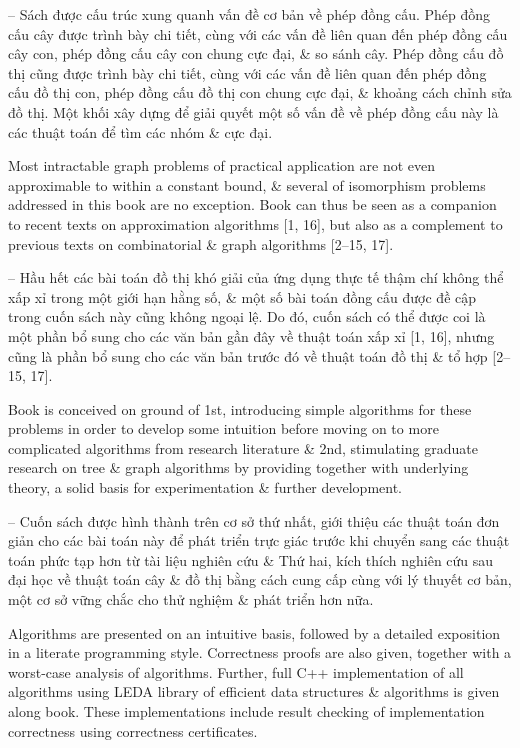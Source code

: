 \documentclass{article}
\begin{document}
\begin{itemize}
	-- Sách được cấu trúc xung quanh vấn đề cơ bản về phép đồng cấu. Phép đồng cấu cây được trình bày chi tiết, cùng với các vấn đề liên quan đến phép đồng cấu cây con, phép đồng cấu cây con chung cực đại, \& so sánh cây. Phép đồng cấu đồ thị cũng được trình bày chi tiết, cùng với các vấn đề liên quan đến phép đồng cấu đồ thị con, phép đồng cấu đồ thị con chung cực đại, \& khoảng cách chỉnh sửa đồ thị. Một khối xây dựng để giải quyết một số vấn đề về phép đồng cấu này là các thuật toán để tìm các nhóm \& cực đại.
	
	Most intractable graph problems of practical application are not even approximable to within a constant bound, \& several of isomorphism problems addressed in this book are no exception. Book can thus be seen as a companion to recent texts on approximation algorithms [1, 16], but also as a complement to previous texts on combinatorial \& graph algorithms [2--15, 17].
	
	-- Hầu hết các bài toán đồ thị khó giải của ứng dụng thực tế thậm chí không thể xấp xỉ trong một giới hạn hằng số, \& một số bài toán đồng cấu được đề cập trong cuốn sách này cũng không ngoại lệ. Do đó, cuốn sách có thể được coi là một phần bổ sung cho các văn bản gần đây về thuật toán xấp xỉ [1, 16], nhưng cũng là phần bổ sung cho các văn bản trước đó về thuật toán đồ thị \& tổ hợp [2--15, 17].
	
	Book is conceived on ground of 1st, introducing simple algorithms for these problems in order to develop some intuition before moving on to more complicated algorithms from research literature \& 2nd, stimulating graduate research on tree \& graph algorithms by providing together with underlying theory, a solid basis for experimentation \& further development.
	
	-- Cuốn sách được hình thành trên cơ sở thứ nhất, giới thiệu các thuật toán đơn giản cho các bài toán này để phát triển trực giác trước khi chuyển sang các thuật toán phức tạp hơn từ tài liệu nghiên cứu \& Thứ hai, kích thích nghiên cứu sau đại học về thuật toán cây \& đồ thị bằng cách cung cấp cùng với lý thuyết cơ bản, một cơ sở vững chắc cho thử nghiệm \& phát triển hơn nữa.
	
	Algorithms are presented on an intuitive basis, followed by a detailed exposition in a literate programming style. Correctness proofs are also given, together with a worst-case analysis of algorithms. Further, full C++ implementation of all algorithms using LEDA library of efficient data structures \& algorithms is given along book. These implementations include result checking of implementation correctness using correctness certificates.
	

\end{itemize}
\end{document}
